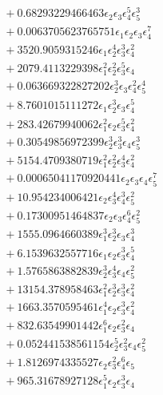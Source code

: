 \documentclass[10pt]{article}
\begin{document}
\begin{align*}
&{}  + 0.68293229466463 \epsilon_{2} \epsilon_{3} \epsilon_{4}^{5} \epsilon_{5}^{3} \\
&{}  + 0.0063705623765751 \epsilon_{1} \epsilon_{2} \epsilon_{3} \epsilon_{4}^{7} \\
&{}  + 3520.9059315246 \epsilon_{1} \epsilon_{2}^{4} \epsilon_{3}^{3} \epsilon_{4}^{2} \\
&{}  + 2079.4113229398 \epsilon_{1}^{2} \epsilon_{2}^{2} \epsilon_{3}^{5} \epsilon_{4} \\
&{}  + 0.063669322827202 \epsilon_{2}^{3} \epsilon_{3} \epsilon_{4}^{2} \epsilon_{5}^{4} \\
&{}  + 8.7601015111272 \epsilon_{1} \epsilon_{2}^{3} \epsilon_{3} \epsilon_{4}^{5} \\
&{}  + 283.42679940062 \epsilon_{1}^{2} \epsilon_{2} \epsilon_{3}^{5} \epsilon_{4}^{2} \\
&{}  + 0.30549856972399 \epsilon_{2}^{3} \epsilon_{3}^{3} \epsilon_{4} \epsilon_{5}^{3} \\
&{}  + 5154.4709380719 \epsilon_{1}^{2} \epsilon_{2}^{2} \epsilon_{3}^{4} \epsilon_{4}^{2} \\
&{}  + 0.00065041170920441 \epsilon_{2} \epsilon_{3} \epsilon_{4} \epsilon_{5}^{7} \\
&{}  + 10.954234006421 \epsilon_{2} \epsilon_{3}^{4} \epsilon_{4}^{3} \epsilon_{5}^{2} \\
&{}  + 0.17300951464837 \epsilon_{2} \epsilon_{3} \epsilon_{4}^{6} \epsilon_{5}^{2} \\
&{}  + 1555.0964660389 \epsilon_{1}^{3} \epsilon_{2}^{3} \epsilon_{3} \epsilon_{4}^{3} \\
&{}  + 6.1539632557716 \epsilon_{1} \epsilon_{2} \epsilon_{3}^{3} \epsilon_{4}^{5} \\
&{}  + 1.5765863882839 \epsilon_{2}^{3} \epsilon_{3}^{4} \epsilon_{4} \epsilon_{5}^{2} \\
&{}  + 13154.378958463 \epsilon_{1}^{2} \epsilon_{2}^{3} \epsilon_{3}^{3} \epsilon_{4}^{2} \\
&{}  + 1663.3570595461 \epsilon_{1}^{4} \epsilon_{2} \epsilon_{3}^{3} \epsilon_{4}^{2} \\
&{}  + 832.63549901442 \epsilon_{1}^{6} \epsilon_{2} \epsilon_{3}^{2} \epsilon_{4} \\
&{}  + 0.052441538561154 \epsilon_{2}^{5} \epsilon_{3}^{2} \epsilon_{4} \epsilon_{5}^{2} \\
&{}  + 1.8126974335527 \epsilon_{2} \epsilon_{3}^{2} \epsilon_{4}^{6} \epsilon_{5} \\
&{}  + 965.31678927128 \epsilon_{1}^{5} \epsilon_{2} \epsilon_{3}^{3} \epsilon_{4} \\

\end{align*}
\end{document}
